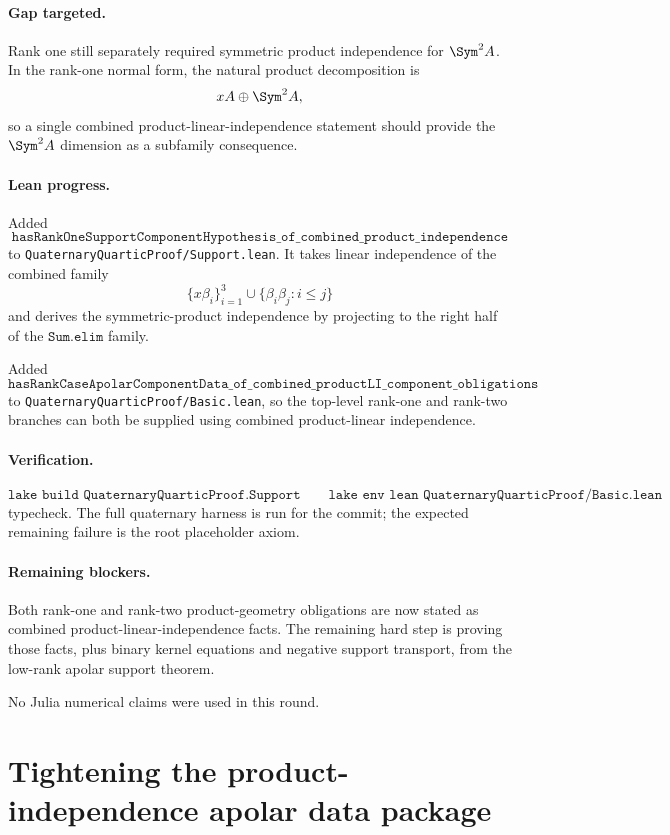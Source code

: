 \documentclass[11pt]{article}
\begin{document}
\paragraph{Gap targeted.}
Rank one still separately required symmetric product independence for
\(\Sym^2A\).  In the rank-one normal form, the natural product decomposition is
\[
xA\oplus\Sym^2A,
\]
so a single combined product-linear-independence statement should provide the
\(\Sym^2A\) dimension as a subfamily consequence.

\paragraph{Lean progress.}
Added
\[
\texttt{hasRankOneSupportComponentHypothesis\_of\_combined\_product\_independence}
\]
to \texttt{QuaternaryQuarticProof/Support.lean}.  It takes linear independence
of the combined family
\[
\{x\beta_i\}_{i=1}^3
\cup
\{\beta_i\beta_j:i\le j\}
\]
and derives the symmetric-product independence by projecting to the right half
of the \(\texttt{Sum.elim}\) family.

Added
\[
\texttt{hasRankCaseApolarComponentData\_of\_combined\_productLI\_component\_obligations}
\]
to \texttt{QuaternaryQuarticProof/Basic.lean}, so the top-level rank-one and
rank-two branches can both be supplied using combined product-linear
independence.

\paragraph{Verification.}
\[
\texttt{lake build QuaternaryQuarticProof.Support}
\qquad
\texttt{lake env lean QuaternaryQuarticProof/Basic.lean}
\]
typecheck.  The full quaternary harness is run for the commit; the expected
remaining failure is the root placeholder axiom.

\paragraph{Remaining blockers.}
Both rank-one and rank-two product-geometry obligations are now stated as
combined product-linear-independence facts.  The remaining hard step is proving
those facts, plus binary kernel equations and negative support transport, from
the low-rank apolar support theorem.

No Julia numerical claims were used in this round.

\section*{Tightening the product-independence apolar data package}
\end{document}

